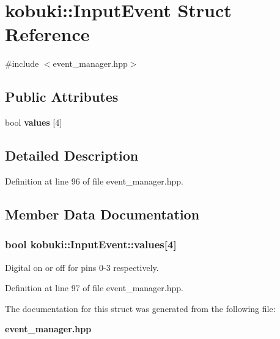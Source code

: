 \section{kobuki\-:\-:\-Input\-Event \-Struct \-Reference}
\label{structkobuki_1_1InputEvent}


{\ttfamily \#include $<$event\-\_\-manager.\-hpp$>$}

\subsection*{\-Public \-Attributes}
\begin{DoxyCompactItemize}
\item 
bool {\bf values} [4]
\end{DoxyCompactItemize}


\subsection{\-Detailed \-Description}


\-Definition at line 96 of file event\-\_\-manager.\-hpp.



\subsection{\-Member \-Data \-Documentation}
\subsubsection[{values}]{\setlength{\rightskip}{0pt plus 5cm}bool {\bf kobuki\-::\-Input\-Event\-::values}[4]}\label{structkobuki_1_1InputEvent_aca6f9a799c250a9e69d011e85bf6b0eb}
\-Digital on or off for pins 0-\/3 respectively. 

\-Definition at line 97 of file event\-\_\-manager.\-hpp.



\-The documentation for this struct was generated from the following file\-:\begin{DoxyCompactItemize}
\item 
{\bf event\-\_\-manager.\-hpp}\end{DoxyCompactItemize}
